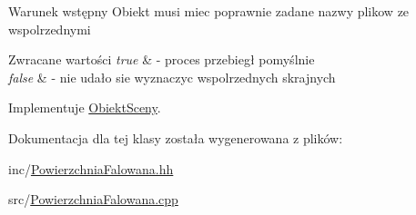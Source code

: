 \begin{DoxyPrecond}{Warunek wstępny}
Obiekt musi miec poprawnie zadane nazwy plikow ze wspolrzednymi 
\end{DoxyPrecond}

\begin{DoxyRetVals}{Zwracane wartości}
{\em true} & -\/ proces przebiegł pomyślnie \\
\hline
{\em false} & -\/ nie udało sie wyznaczyc wspolrzednych skrajnych \\
\hline
\end{DoxyRetVals}


Implementuje \hyperlink{classObiektSceny_a24dd0332c0755d7155128639a9a3e2b4}{Obiekt\+Sceny}.



Dokumentacja dla tej klasy została wygenerowana z plików\+:\begin{DoxyCompactItemize}
\item 
inc/\hyperlink{PowierzchniaFalowana_8hh}{Powierzchnia\+Falowana.\+hh}\item 
src/\hyperlink{PowierzchniaFalowana_8cpp}{Powierzchnia\+Falowana.\+cpp}\end{DoxyCompactItemize}
